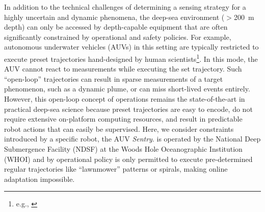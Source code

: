 In addition to the technical challenges of determining a sensing strategy for a highly uncertain and dynamic phenomena, the deep-sea environment ($>$\SI{200}{\meter} depth) can only be accessed by depth-capable equipment that are often significantly constrained by operational and safety policies. For example, autonomous underwater vehicles (AUVs) in this setting are typically restricted to execute preset trajectories hand-designed by human scientists\footnote{e.g., \autocite{camilli2010tracking}}. In this mode, the AUV cannot react to measurements while executing the set trajectory. Such ``open-loop'' trajectories can result in sparse measurements of a target phenomenon, such as a dynamic plume, or can miss short-lived events entirely\autocite{flaspohler2019information, preston2019adaptive}. However, this open-loop concept of operations remains the state-of-the-art in practical deep-sea science because preset trajectories are easy to encode, do not require extensive on-platform computing resources, and result in predictable robot actions that can easily be supervised. Here, we consider constraints introduced by a specific robot, the AUV \emph{Sentry}. \Sentry is operated by the National Deep Submergence Facility (NDSF) at the Woods Hole Oceanographic Institution (WHOI)\autocite{kaiser2016design} and by operational policy is only permitted to execute pre-determined regular trajectories like ``lawnmower'' patterns or spirals, making online adaptation impossible. %

